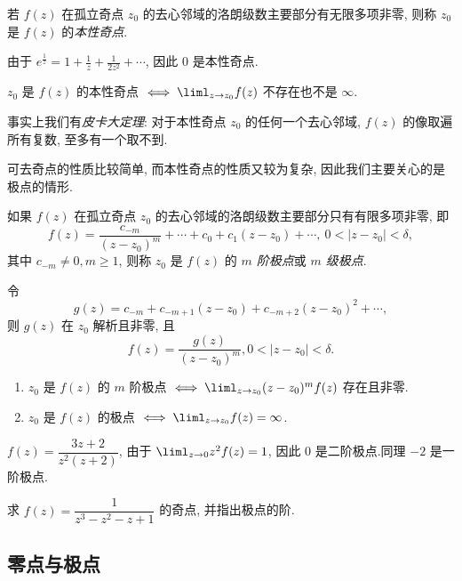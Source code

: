 \begin{definition}
	若 $f(z)$ 在孤立奇点 $z_0$ 的去心邻域的洛朗级数主要部分有无限多项非零, 则称 $z_0$ 是 $f(z)$ 的\emph{本性奇点}.
\end{definition}

\begin{example}
	由于 $\displaystyle e^{\frac1z}=1+\frac1z+\frac1{2z^2}+\cdots$, 因此 $0$ 是本性奇点.
\end{example}

\begin{theorem}
	$z_0$ 是 $f(z)$ 的本性奇点 $\iff\liml_{z\to z_0}f(z)$ 不存在也不是 $\infty$.
\end{theorem}

事实上我们有\emph{皮卡大定理}: 对于本性奇点 $z_0$ 的任何一个去心邻域, $f(z)$ 的像取遍所有复数, 至多有一个取不到.

可去奇点的性质比较简单, 而本性奇点的性质又较为复杂, 因此我们主要关心的是极点的情形.

\begin{definition}
	如果 $f(z)$ 在孤立奇点 $z_0$ 的去心邻域的洛朗级数主要部分只有有限多项非零, 即
	\[f(z)=\frac{c_{-m}}{(z-z_0)^m}+\cdots+c_0+c_1(z-z_0)+\cdots,\ 0<|z-z_0|<\delta,\]
	其中 $c_{-m}\neq 0,m\ge 1$, 则称 $z_0$ 是 $f(z)$ 的 \emph{$m$ 阶极点}或 \emph{$m$ 级极点}.
\end{definition}

令
\[g(z)=c_{-m}+c_{-m+1}(z-z_0)+c_{-m+2}(z-z_0)^2+\cdots,\]
则 $g(z)$ 在 $z_0$ 解析且非零,
且
\[f(z)=\dfrac{g(z)}{(z-z_0)^m},0<|z-z_0|<\delta.\]

\begin{theorem}
	\begin{enumerate}
		\item $z_0$ 是 $f(z)$ 的 $m$ 阶极点 $\iff\liml_{z\to z_0}(z-z_0)^mf(z)$ 存在且非零.
		\item $z_0$ 是 $f(z)$ 的极点 $\iff\liml_{z\to z_0}f(z)=\infty$.
	\end{enumerate}
\end{theorem}

\begin{example}
		$f(z)=\dfrac{3z+2}{z^2(z+2)}$,
	{由于 $\liml_{z\to 0}z^2f(z)=1$, 因此 $0$ 是二阶极点.同理 $-2$ 是一阶极点.
	}
\end{example}

\begin{exercise}
	求 $f(z)=\dfrac1{z^3-z^2-z+1}$ 的奇点, 并指出极点的阶.
\end{exercise}

\subsection{零点与极点}


